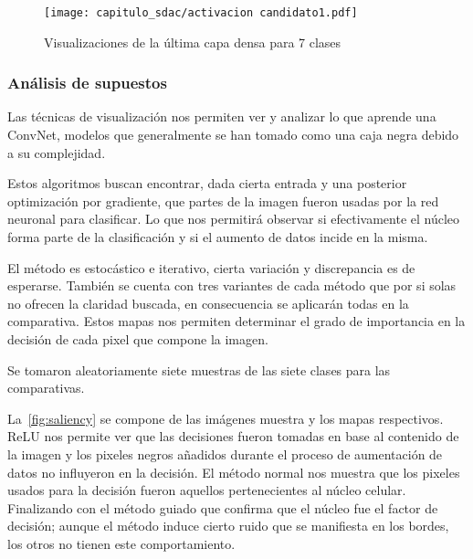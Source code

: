 \begin{figure}[H]
    \centering
    \texttt{[image: capitulo\_sdac/activacion candidato1.pdf]}
    \caption{Visualizaciones de la última capa densa para 7 clases}\label{fig:densa}
\end{figure}

\subsubsection{Análisis de supuestos}

Las técnicas de visualización nos permiten ver y analizar lo que aprende una
ConvNet, modelos que generalmente se han tomado como una caja negra debido a su
complejidad.

Estos algoritmos buscan encontrar, dada cierta entrada y una posterior
optimización por gradiente, que partes de la imagen fueron usadas por la red
neuronal para clasificar. Lo que nos permitirá observar si efectivamente el
núcleo forma parte de la clasificación y si el aumento de datos incide en la
misma.

El método es estocástico e iterativo, cierta variación y discrepancia es de
esperarse. También se cuenta con tres variantes de cada método que por si solas
no ofrecen la claridad buscada, en consecuencia se aplicarán todas en la
comparativa. Estos mapas nos permiten determinar el grado de importancia en la
decisión de cada pixel que compone la imagen.

Se tomaron aleatoriamente siete muestras de las siete clases para las
comparativas.

La~\autoref{fig:saliency} se compone de las imágenes muestra y los mapas
respectivos. ReLU nos permite ver que las decisiones fueron tomadas en base al
contenido de la imagen y los pixeles negros añadidos durante el proceso de
aumentación de datos no influyeron en la decisión. El método normal nos muestra
que los pixeles usados para la decisión fueron aquellos pertenecientes al núcleo
celular. Finalizando con el método guiado que confirma que el núcleo fue el
factor de decisión; aunque el método induce cierto ruido que se manifiesta en
los bordes, los otros no tienen este comportamiento.

